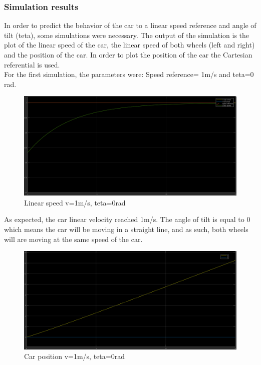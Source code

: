 \subsubsection{Simulation results}

In order to predict the behavior of the car to a linear speed reference and angle of tilt (teta), some simulations were necessary. The output of the simulation is the plot of the linear speed of the car, the linear speed of both wheels (left and right) and the position of the car.
In order to plot the position of the car the Cartesian referential is used.\\
For the first simulation, the parameters were: Speed reference= 1m/s and teta=0 rad.\\
\newpage
\begin{figure}[!h]
\centering
\includegraphics[width=1.0\textwidth]{./img/vel10.PNG}
\caption {\label{fig:sim1 - vel}Linear speed v=1m/s, teta=0rad}
\end{figure}
 As expected, the car linear velocity reached 1m/s. The angle of tilt is equal to 0 which means the car will be moving in a straight line, and as such, both wheels will are moving at the same speed of the car.\\
\newpage
\begin{figure}[!h]
\centering
\includegraphics[width=1.0\textwidth]{./img/xy10.PNG}
\caption {\label{fig:sim1 - pos}Car position v=1m/s, teta=0rad}
\end{figure}
